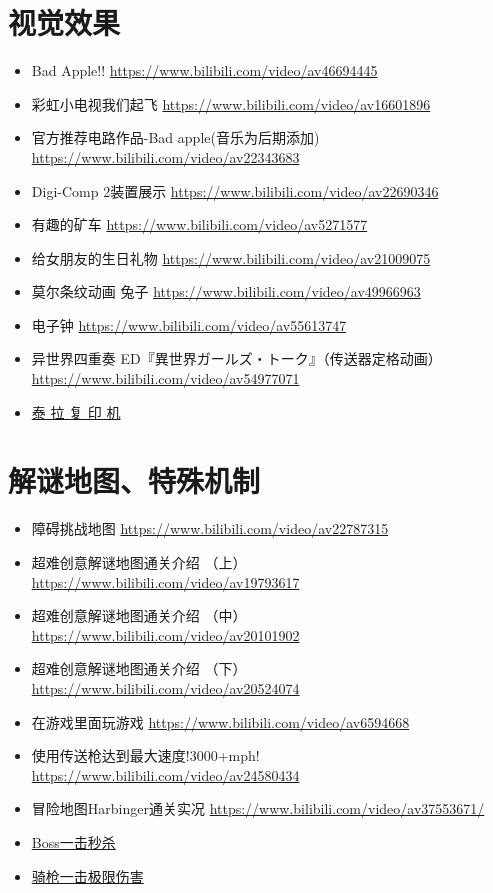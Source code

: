 \section{视觉效果}
\begin{itemize}
\item Bad Apple!! \url{https://www.bilibili.com/video/av46694445}
\item 彩虹小电视我们起飞 \url{https://www.bilibili.com/video/av16601896}
\item 官方推荐电路作品-Bad apple(音乐为后期添加) \url{https://www.bilibili.com/video/av22343683}
\item Digi-Comp 2装置展示 \url{https://www.bilibili.com/video/av22690346}
\item 有趣的矿车 \url{https://www.bilibili.com/video/av5271577}
\item 给女朋友的生日礼物 \url{https://www.bilibili.com/video/av21009075}
\item 莫尔条纹动画 兔子 \url{https://www.bilibili.com/video/av49966963}
\item 电子钟 \url{https://www.bilibili.com/video/av55613747}
\item 异世界四重奏 ED『異世界ガールズ・トーク』（传送器定格动画） \url{https://www.bilibili.com/video/av54977071}
\item \href{https://www.bilibili.com/video/BV1ME411P7QD}{泰 拉 复 印 机}
\end{itemize}

\section{解谜地图、特殊机制}
\begin{itemize}
\item 障碍挑战地图 \url{https://www.bilibili.com/video/av22787315}
\item 超难创意解谜地图通关介绍 （上） \url{https://www.bilibili.com/video/av19793617}
\item 超难创意解谜地图通关介绍 （中） \url{https://www.bilibili.com/video/av20101902}
\item 超难创意解谜地图通关介绍 （下） \url{https://www.bilibili.com/video/av20524074}
\item 在游戏里面玩游戏 \url{https://www.bilibili.com/video/av6594668}
\item 使用传送枪达到最大速度!3000+mph! \url{https://www.bilibili.com/video/av24580434}
\item 冒险地图Harbinger通关实况 \url{https://www.bilibili.com/video/av37553671/}
\item \href{https://www.bilibili.com/video/av20725652}{Boss一击秒杀}
\item \href{https://www.bilibili.com/video/BV1Df4y1s75E}{骑枪一击极限伤害}
\end{itemize}

